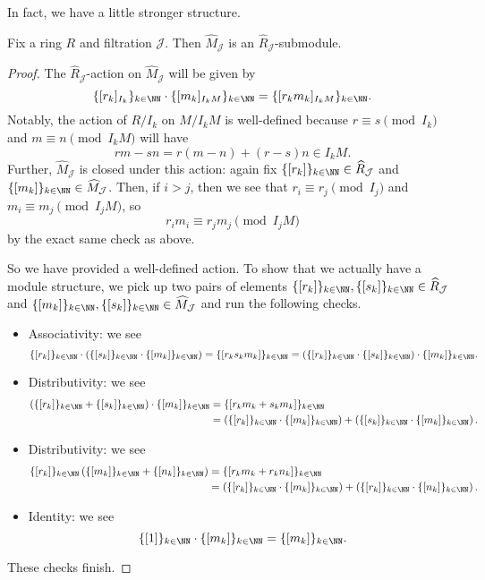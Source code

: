 In fact, we have a little stronger structure.
\begin{lemma}
	Fix a ring $R$ and filtration $\mathcal J$. Then $\widehat M_\mathcal J$ is an $\widehat R_\mathcal J$-submodule.
\end{lemma}
\begin{proof}
	The $\widehat R_\mathcal J$-action on $\widehat M_\mathcal J$ will be given by
	\[\{[r_k]_{I_k}\}_{k\in\NN}\cdot\{[m_k]_{I_kM}\}_{k\in\NN}=\{[r_km_k]_{I_kM}\}_{k\in\NN}.\]
	Notably, the action of $R/I_k$ on $M/I_kM$ is well-defined because $r\equiv s\pmod{I_k}$ and $m\equiv n\pmod{I_kM}$ will have
	\[rm-sn=r(m-n)+(r-s)n\in I_kM.\]
	Further, $\widehat M_\mathcal J$ is closed under this action: again fix $\{[r_k]\}_{k\in\NN}\in\widehat R_\mathcal J$ and $\{[m_k]\}_{k\in\NN}\in\widehat M_\mathcal J$. Then, if $i>j$, then we see that $r_i\equiv r_j\pmod{I_j}$ and $m_i\equiv m_j\pmod{I_jM}$, so
	\[r_im_i\equiv r_jm_j\pmod{I_jM}\]
	by the exact same check as above.

	So we have provided a well-defined action. To show that we actually have a module structure, we pick up two pairs of elements $\{[r_k]\}_{k\in\NN},\{[s_k]\}_{k\in\NN}\in\widehat R_\mathcal J$ and $\{[m_k]\}_{k\in\NN},\{[s_k]\}_{k\in\NN}\in\widehat M_\mathcal J$ and run the following checks.
	\begin{itemize}
		\item Associativity: we see
		\[\{[r_k]\}_{k\in\NN}\cdot\left(\{[s_k]\}_{k\in\NN}\cdot\{[m_k]\}_{k\in\NN}\right)=\{[r_ks_km_k]\}_{k\in\NN}=\left(\{[r_k]\}_{k\in\NN}\cdot\{[s_k]\}_{k\in\NN}\right)\cdot\{[m_k]\}_{k\in\NN}.\]
		\item Distributivity: we see
		\begin{align*}
			\left(\{[r_k]\}_{k\in\NN}+\{[s_k]\}_{k\in\NN}\right)\cdot\{[m_k]\}_{k\in\NN} &= \{[r_km_k+s_km_k]\}_{k\in\NN} \\
			&= \left(\{[r_k]\}_{k\in\NN}\cdot\{[m_k]\}_{k\in\NN}\right)+\left(\{[s_k]\}_{k\in\NN}\cdot\{[m_k]\}_{k\in\NN}\right).
		\end{align*}
		\item Distributivity: we see
		\begin{align*}
			\{[r_k]\}_{k\in\NN}\left(\{[m_k]\}_{k\in\NN}+\{[n_k]\}_{k\in\NN}\right) &= \{[r_km_k+r_kn_k]\}_{k\in\NN} \\
			&= \left(\{[r_k]\}_{k\in\NN}\cdot\{[m_k]\}_{k\in\NN}\right)+\left(\{[r_k]\}_{k\in\NN}\cdot\{[n_k]\}_{k\in\NN}\right).
		\end{align*}
		\item Identity: we see
		\[\{[1]\}_{k\in\NN}\cdot\{[m_k]\}_{k\in\NN}=\{[m_k]\}_{k\in\NN}.\]
	\end{itemize}
	These checks finish.
\end{proof}

